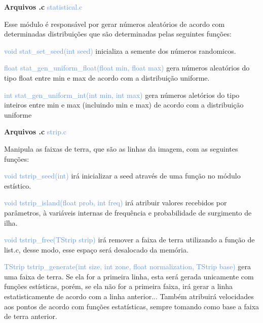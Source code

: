 \documentclass[a4paper,12pt]{article}
\begin{document}
\bigskip
\bigskip
\bigskip

{\Large \textcolor{NavyBlue}{ \textbf{Arquivos .c  }}}{\large \textcolor{CornflowerBlue}{  statistical.c}}
\bigskip

Esse módulo é responsável por gerar números aleatórios de acordo com determinadas distribuições que são determinadas pelas seguintes funções:

{\textcolor{CornflowerBlue}{void stat\_set\_seed(int seed)}} inicializa a semente dos números randomicos.

{\textcolor{CornflowerBlue}{float stat\_gen\_uniform\_float(float min, float max)}} gera números aleatórios do tipo float entre min e max de acordo com a distribuição uniforme.

{\textcolor{CornflowerBlue}{int stat\_gen\_uniform\_int(int min, int max)}} gera números aletórios do tipo inteiros entre min e max (incluindo min e max) de acordo com a distribuição uniforme

\newpage %


{\Large \textcolor{NavyBlue}{ \textbf{Arquivos .c  }}}{\large \textcolor{CornflowerBlue}{  strip.c}}
\bigskip

Manipula as faixas de terra, que são as linhas da imagem, com as seguintes funções:

{\textcolor{CornflowerBlue}{void   tstrip\_seed(int)}} irá inicializar a seed através de uma função no módulo estístico.

{\textcolor{CornflowerBlue}{void tstrip\_island(float prob, int freq)}} irá atribuir valores recebidos por parâmetros, à variáveis internas de frequência e probabilidade de surgimento de ilha.

{\textcolor{CornflowerBlue}{void tstrip\_free(TStrip strip)}} irá remover a faixa de terra utilizando a função de list.c, desse modo, esse espaço será desalocado da memória.

{\textcolor{CornflowerBlue}{TStrip tstrip\_generate(int size, int zone, float normalization, TStrip base)}} gera uma faixa de terra. Se ela for a primeira linha, esta será gerada unicamente com funções estísticas, porém, se ela não for a primeira faixa, irá gerar a linha estatisticamente de acordo com a linha anterior... Também atribuirá velocidades aos pontos de acordo com funções estatísticas, sempre tomando como base a faixa de terra anterior. 

\bigskip
\bigskip
\bigskip
\end{document}
